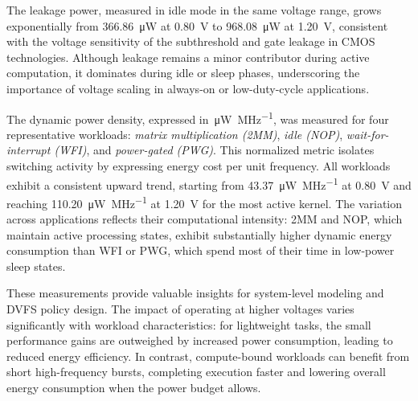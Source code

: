             The leakage power, measured in idle mode in the same voltage range, grows exponentially from \SI{366.86}{\micro\watt} at \SI{0.80}{\volt} to \SI{968.08}{\micro\watt} at \SI{1.20}{\volt}, consistent with the voltage sensitivity of the subthreshold and gate leakage in CMOS technologies. Although leakage remains a minor contributor during active computation, it dominates during idle or sleep phases, underscoring the importance of voltage scaling in always-on or low-duty-cycle applications.

            The dynamic power density, expressed in~\si{\micro\watt\per\mega\hertz}, was measured for four representative workloads: \emph{matrix multiplication (2MM)}, \emph{idle (NOP)}, \emph{wait-for-interrupt (WFI)}, and \emph{power-gated (PWG)}. This normalized metric isolates switching activity by expressing energy cost per unit frequency. All workloads exhibit a consistent upward trend, starting from \SI{43.37}{\micro\watt\per\mega\hertz} at \SI{0.80}{\volt} and reaching \SI{110.20}{\micro\watt\per\mega\hertz} at \SI{1.20}{\volt} for the most active kernel. The variation across applications reflects their computational intensity: 2MM and NOP, which maintain active processing states, exhibit substantially higher dynamic energy consumption than WFI or PWG, which spend most of their time in low-power sleep states.

            These measurements provide valuable insights for system-level modeling and DVFS policy design. The impact of operating at higher voltages varies significantly with workload characteristics: for lightweight tasks, the small performance gains are outweighed by increased power consumption, leading to reduced energy efficiency. In contrast, compute-bound workloads can benefit from short high-frequency bursts, completing execution faster and lowering overall energy consumption when the power budget allows.

